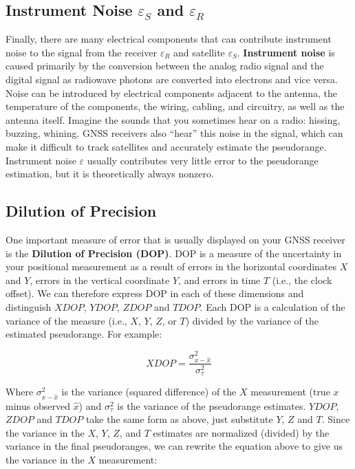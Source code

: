 \documentclass[
]{book}
\begin{document}
\subsection{\texorpdfstring{Instrument Noise \(ε_S\) and \(ε_R\)}{Instrument Noise ε\_S and ε\_R}}\label{instrument-noise-ux3b5_s-and-ux3b5_r}

Finally, there are many electrical components that can contribute instrument noise to the signal from the receiver \(ε_R\) and satellite \(ε_S\). \textbf{Instrument noise} is caused primarily by the conversion between the analog radio signal and the digital signal as radiowave photons are converted into electrons and vice versa. Noise can be introduced by electrical components adjacent to the antenna, the temperature of the components, the wiring, cabling, and circuitry, as well as the antenna itself. Imagine the sounds that you sometimes hear on a radio: hissing, buzzing, whining. GNSS receivers also ``hear'' this noise in the signal, which can make it difficult to track satellites and accurately estimate the pseudorange. Instrument noise \(ε\) usually contributes very little error to the pseudorange estimation, but it is theoretically always nonzero.

\subsection{Dilution of Precision}\label{dilution-of-precision}

One important measure of error that is usually displayed on your GNSS receiver is the \textbf{Dilution of Precision (DOP)}. DOP is a measure of the uncertainty in your positional measurement as a result of errors in the horizontal coordinates \(X\) and \(Y\), errors in the vertical coordinate \(Y\), and errors in time \(T\) (i.e., the clock offset). We can therefore express DOP in each of these dimensions and distinguish \(XDOP\), \(YDOP\), \(ZDOP\) and \(TDOP\). Each DOP is a calculation of the variance of the measure (i.e., \(X\), \(Y\), \(Z\), or \(T\)) divided by the variance of the estimated pseudorange. For example:

\[
XDOP = \frac{σ_{x-\hat{x}}^{2}}{σ_τ^{2}}
\]

Where \(σ_{x-\hat{x}}^{2}\) is the variance (squared difference) of the \(X\) measurement (true \(x\) minus observed \(\hat{x}\)) and \(σ_τ^{2}\) is the variance of the pseudorange estimates. \(YDOP\), \(ZDOP\) and \(TDOP\) take the same form as above, just substitute \(Y\), \(Z\) and \(T\). Since the variance in the \(X\), \(Y\), \(Z\), and \(T\) estimates are normalized (divided) by the variance in the final pseudoranges, we can rewrite the equation above to give us the variance in the \(X\) measurement:
\end{document}
